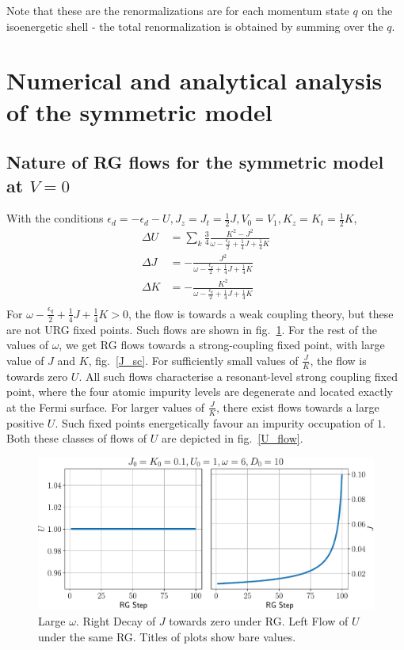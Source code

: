 \documentclass[twoside]{report}
\numberwithin{equation}{section}
\begin{document}
Note that these are the renormalizations are for each momentum state \(q\) on the isoenergetic shell - the total renormalization is obtained by summing over the \(q\).
\section{Numerical and analytical analysis of the symmetric model}
\subsection{Nature of RG flows for the symmetric model at \(V = 0\)}
With the conditions \(\epsilon_d = -\epsilon_d - U, J_z = J_t = \frac{1}{2}J, V_0 = V_1, K_z = K_t = \frac{1}{2}K\),
\begin{equation}\begin{aligned}
	\Delta U &= \sum_k \frac{3}{4}\frac{K^2 - J^2}{\omega - \frac{\epsilon_q}{2} + \frac{1}{4}J + \frac{1}{4}K} \\
	\Delta J &= - \frac{J^2}{\omega - \frac{\epsilon_q}{2} + \frac{1}{4}J + \frac{1}{4}K}\\
	\Delta K &= - \frac{K^2}{\omega - \frac{\epsilon_q}{2} + \frac{1}{4}J + \frac{1}{4}K}\\
\end{aligned}\end{equation}
For \(\omega - \frac{\epsilon_q}{2} + \frac{1}{4}J + \frac{1}{4}K > 0\), the flow is towards a weak coupling theory, but these are not URG fixed points. Such flows are shown in fig.~\ref{Jdecay}. For the rest of the values of \(\omega\), we get RG flows towards a strong-coupling fixed point, with large value of \(J\) and \(K\), fig.~\ref{J_sc}. For sufficiently small values of \(\frac{J}{K}\), the flow is towards zero \(U\). All such flows characterise a resonant-level strong coupling fixed point, where the four atomic impurity levels are degenerate and located exactly at the Fermi surface. For larger values of \(\frac{J}{K}\), there exist flows towards a large positive \(U\). Such fixed points energetically favour an impurity occupation of \(1\). Both these classes of flows of \(U\) are depicted in fig.~\ref{U_flow}.
\begin{figure}[htpb]
	\centering
	\includegraphics[width=\textwidth]{../figures/large_w.pdf}
	\caption{Large \(\omega\). Right Decay of \(J\) towards zero under RG. Left Flow of \(U\) under the same RG. Titles of plots show bare values.}
	\label{Jdecay}
\end{figure}
\end{document}
